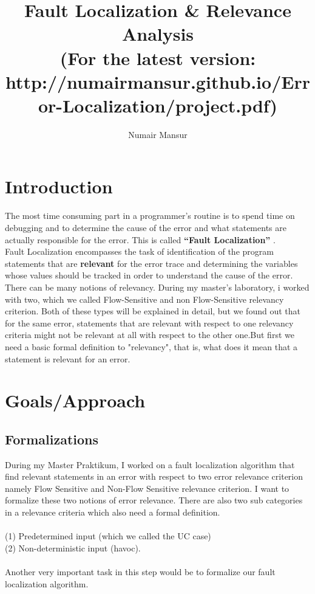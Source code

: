 \documentclass{article}
\title{Fault Localization \& Relevance Analysis \\ {\tiny (For the latest version: http://numairmansur.github.io/Error-Localization/project.pdf)}}
\author{Numair Mansur}
\begin{document}
\maketitle
\section{Introduction}
The most time consuming part in a programmer’s routine is to spend time on debugging and to determine the cause of the error and what statements are actually responsible for the error. This is called \textbf{“Fault Localization”} . 
\\
Fault Localization encompasses the task of identification of the program statements that are \textbf{relevant}  for the error trace and determining the variables whose values should be tracked in order to understand the cause of the error. 
\\
There can be many notions of relevancy. During my master’s laboratory, i worked with two, which we called Flow-Sensitive and non Flow-Sensitive relevancy criterion. Both of these types will be explained in detail, but we found out that for the same error, statements that are relevant with respect to one relevancy criteria might not be relevant at all with respect to the other one.But first we need a basic formal definition to "relevancy", that is, what does it mean that a statement is relevant for an error.

\section{Goals/Approach}
\subsection{Formalizations}
During my Master Praktikum, I worked on a fault localization algorithm that find relevant statements in an error with respect to two error relevance criterion namely Flow Sensitive and Non-Flow Sensitive relevance criterion. I want to formalize these two notions of error relevance. There are also two sub categories in a relevance criteria which also need a formal definition.\\ 
\\(1) Predetermined input (which we called the UC case) 
\\ (2) Non-deterministic input (havoc).\\
\\Another very important task in this step would be to formalize our fault localization algorithm.
\end{document}
